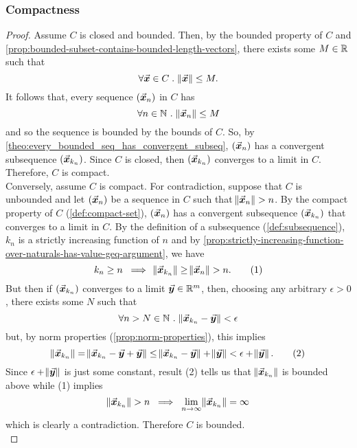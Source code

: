 \documentclass[../MathsNotesBase.tex]{subfiles}
\begin{document}
{		
		\biggerskip
		\subsubsection{Compactness}
		\bigskip
		
		\biggerskip
		\begin{proof}
			Assume $C$ is closed and bounded. Then, by the bounded property of $C$ and \autoref{prop:bounded-subset-contains-bounded-length-vectors}, there exists some ${ M \in \mathbb{R}^{} }$ such that
			\[ \forall \vec{\bm{x}} \in C \;.\; \norm{\vec{\bm{x}}} \leq M. \]
			It follows that, every sequence $(\vec{\bm{x}}_n)$ in $C$ has
			\[ \forall n \in \mathbb{N}^{} \;.\; \norm{\vec{\bm{x}}_n} \leq M \]
			and so the sequence is bounded by the bounds of $C$. So, by \autoref{theo:every_bounded_seq_has_convergent_subseq}, $(\vec{\bm{x}}_n)$ has a convergent subsequence $(\vec{\bm{x}}_{k_n})$. Since $C$ is closed, then $(\vec{\bm{x}}_{k_n})$ converges to a limit in $C$. Therefore, $C$ is compact.\\
			
			Conversely, assume $C$ is compact. For contradiction, suppose that $C$ is unbounded and let $(\vec{\bm{x}}_n)$ be a sequence in $C$ such that ${ \norm{\vec{\bm{x}}_n} > n }$. By the compact property of $C$ (\ref{def:compact-set}), $(\vec{\bm{x}}_n)$ has a convergent subsequence $(\vec{\bm{x}}_{k_n})$ that converges to a limit in $C$. By the definition of a subsequence (\ref{def:subsequence}), $k_n$ is a strictly increasing function of $n$ and by \autoref{prop:strictly-increasing-function-over-naturals-has-value-geq-argument}, we have
			\[ k_n \geq n \; \implies \; \norm{\vec{\bm{x}}_{k_n}} \geq \norm{\vec{\bm{x}}_n} > n. \tag{1} \]
			But then if $(\vec{\bm{x}}_{k_n})$ converges to a limit ${ \vec{\bm{y}} \in \mathbb{R}^{m} }$, then, choosing any arbitrary ${ \epsilon > 0 }$, there exists some $N$ such that
			\[ \forall n > N \in \mathbb{N}^{}\;.\; \norm{\vec{\bm{x}}_{k_n} - \vec{\bm{y}}} < \epsilon \]
			but, by norm properties (\ref{prop:norm-properties}), this implies
			\[ \norm{\vec{\bm{x}}_{k_n}} = \norm{\vec{\bm{x}}_{k_n} - \vec{\bm{y}} + \vec{\bm{y}}} \leq \norm{\vec{\bm{x}}_{k_n} - \vec{\bm{y}}} + \norm{\vec{\bm{y}}} < \epsilon + \norm{\vec{\bm{y}}}.  \tag{2} \]
			Since ${ \epsilon + \norm{\vec{\bm{y}}} }$ is just some constant, result (2) tells us that $\norm{\vec{\bm{x}}_{k_n}}$ is bounded above while (1) implies
			\[ \norm{\vec{\bm{x}}_{k_n}} > n \; \implies \; \lim_{n \to \infty} \norm{\vec{\bm{x}}_{k_n}} = \infty \]
			which is clearly a contradiction. Therefore $C$ is bounded.\\
			

\end{proof}}
\end{document}
